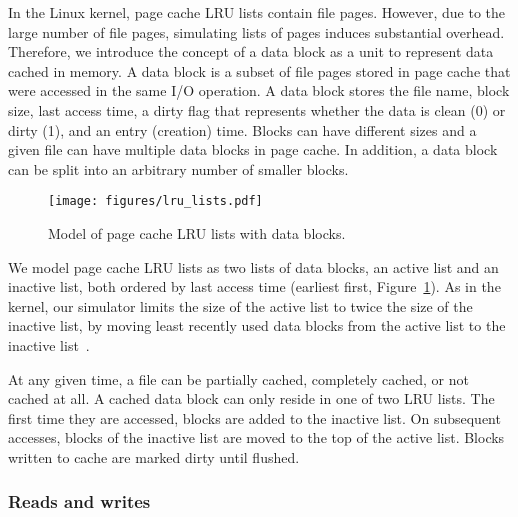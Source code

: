 \documentclass[conference]{IEEEtran}
\begin{document}
    In the Linux kernel, page cache LRU lists contain file pages. However,
    due to the large number of file pages, simulating lists of pages
    induces substantial overhead.
    Therefore, we introduce the concept of a data block as a unit to represent data
    cached in memory. A data block is a subset of file pages stored in
    page cache that were accessed in the same I/O operation.
    A data block stores the file name, block size, last access
    time, a dirty flag that represents whether the data is clean (0)
    or dirty (1), and an entry (creation) time.
    Blocks can have different sizes and a given file can have multiple
    data blocks in page cache. In addition, a data block can be split into an
    arbitrary number of smaller blocks.
    \begin{figure}
           \centering
           \texttt{[image: figures/lru\_lists.pdf]}
           \caption{Model of page cache LRU lists with data blocks.}
           \label{fig:lrulist}
    \end{figure}

    We model page cache LRU lists as
    two lists of data blocks, an active list and an inactive list, both ordered by
    last access time (earliest first, Figure~\ref{fig:lrulist}).
    As in the kernel, our simulator limits the size of the active list to
    twice the size of the inactive list, by moving least recently
    used data blocks from the active list to the inactive list~\cite{gorman2004understanding, linuxdev3rd2010}.

    At any given time, a file can be partially cached, completely cached,
    or not cached at all. A cached data block can only reside in one of two
    LRU lists. The first time they are accessed, blocks are
    added to the inactive list. On subsequent accesses, blocks of the
    inactive list are moved to the top of the active list. Blocks
    written to cache are marked dirty until flushed.

    \subsubsection{Reads and writes}
\end{document}
